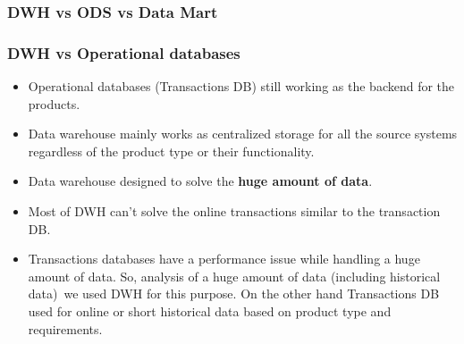 

\begin{frame}
\frametitle{DWH vs ODS vs Data Mart}


\begin{table}[t]
	\centering	
\end{table}
\end{frame}



\begin{frame}
\frametitle{DWH vs Operational databases}
\begin{itemize}[<+->]
		\item Operational databases (Transactions DB) still working as the backend for the products.
		\item Data warehouse mainly works as centralized storage for all the source systems regardless of the product type or their functionality.
		\item Data warehouse designed to solve the \textbf{huge amount of data}.
		\item Most of DWH can't solve the online transactions similar to the transaction DB.
		\item Transactions databases have a performance issue while handling a huge amount of data. So, analysis of a huge amount of data (including historical data) we used DWH for this purpose. On the other hand Transactions DB used for online or short historical data based on product type and requirements.
\end{itemize}
\end{frame}


